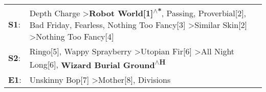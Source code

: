 \begin{supertabular}{p{0.03\textwidth}p{0.92\textwidth}}
 \textbf{S1}:  &  Depth Charge\textsuperscript{} \textgreater \enspace \textbf{Robot World[1]\textsuperscript{$\wedge$*}}, \enspace Passing\textsuperscript{}, \enspace Proverbial[2]\textsuperscript{}, \enspace Bad Friday\textsuperscript{}, \enspace Fearless\textsuperscript{}, \enspace Nothing Too Fancy[3]\textsuperscript{} \textgreater \enspace Similar Skin[2]\textsuperscript{} \textgreater \enspace Nothing Too Fancy[4]\textsuperscript{}  \enspace  \\
 \textbf{S2}:  &                                                                                                                                                                              Ringo[5]\textsuperscript{}, \enspace Wappy Sprayberry\textsuperscript{} \textgreater \enspace Utopian Fir[6]\textsuperscript{} \textgreater \enspace All Night Long[6]\textsuperscript{}, \enspace \textbf{Wizard Burial Ground\textsuperscript{$\wedge$H}}  \enspace  \\
 \textbf{E1}:  &                                                                                                                                                                                                                                                                                                                Unskinny Bop[7]\textsuperscript{} \textgreater \enspace Mother[8]\textsuperscript{}, \enspace Divisions\textsuperscript{}  \enspace  \\
\end{supertabular}
